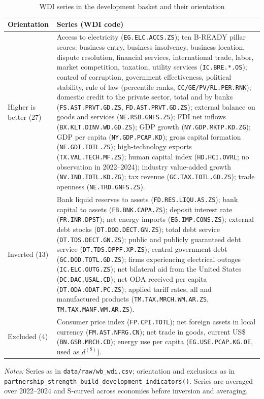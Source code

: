 \begin{table}[tbp]
\centering
\begin{threeparttable}
\caption{WDI series in the development basket and their orientation}
\label{tab:wdi_basket}
\scriptsize
\begin{tabularx}{\textwidth}{@{}p{2.1cm} >{\raggedright\arraybackslash}X@{}}
\toprule
Orientation & Series (WDI code)\\
\midrule
Higher is better (27) &
Access to electricity (\texttt{EG.ELC.ACCS.ZS}); ten B-READY pillar scores: business entry,
business insolvency, business location, dispute resolution, financial services, international
trade, labor, market competition, taxation, utility services (\texttt{IC.BRE.*.OS}); control of
corruption, government effectiveness, political stability, rule of law (percentile ranks,
\texttt{CC/GE/PV/RL.PER.RNK}); domestic credit to the private sector, total and by banks
(\texttt{FS.AST.PRVT.GD.ZS}, \texttt{FD.AST.PRVT.GD.ZS}); external balance on goods and services
(\texttt{NE.RSB.GNFS.ZS}); FDI net inflows (\texttt{BX.KLT.DINV.WD.GD.ZS}); GDP growth
(\texttt{NY.GDP.MKTP.KD.ZG}); GDP per capita (\texttt{NY.GDP.PCAP.KD}); gross capital formation
(\texttt{NE.GDI.TOTL.ZS}); high-technology exports (\texttt{TX.VAL.TECH.MF.ZS}); human capital index
(\texttt{HD.HCI.OVRL}; no observation in 2022--2024); industry value-added growth
(\texttt{NV.IND.TOTL.KD.ZG}); tax revenue (\texttt{GC.TAX.TOTL.GD.ZS}); trade openness
(\texttt{NE.TRD.GNFS.ZS}).\\[2pt]
Inverted (13) &
Bank liquid reserves to assets (\texttt{FD.RES.LIQU.AS.ZS}); bank capital to assets
(\texttt{FB.BNK.CAPA.ZS}); deposit interest rate (\texttt{FR.INR.DPST}); net energy imports
(\texttt{EG.IMP.CONS.ZS}); external debt stocks (\texttt{DT.DOD.DECT.GN.ZS}); total debt service
(\texttt{DT.TDS.DECT.GN.ZS}); public and publicly guaranteed debt service (\texttt{DT.TDS.DPPF.XP.ZS});
central government debt (\texttt{GC.DOD.TOTL.GD.ZS}); firms experiencing electrical outages
(\texttt{IC.ELC.OUTG.ZS}); net bilateral aid from the United States (\texttt{DC.DAC.USAL.CD}); net
ODA received per capita (\texttt{DT.ODA.ODAT.PC.ZS}); applied tariff rates, all and manufactured
products (\texttt{TM.TAX.MRCH.WM.AR.ZS}, \texttt{TM.TAX.MANF.WM.AR.ZS}).\\[2pt]
Excluded (4) &
Consumer price index (\texttt{FP.CPI.TOTL}); net foreign assets in local currency
(\texttt{FM.AST.NFRG.CN}); net trade in goods, current US\$ (\texttt{BN.GSR.MRCH.CD}); energy use per
capita (\texttt{EG.USE.PCAP.KG.OE}, used as $d^{(8)}$).\\
\bottomrule
\end{tabularx}
\begin{tablenotes}[flushleft]\footnotesize
\item \textit{Notes:} Series as in \texttt{data/raw/wb\_wdi.csv}; orientation and exclusions as in
\texttt{partnership\_strength\_build\_development\_indicators()}. Series are averaged over
2022--2024 and S-curved across economies before inversion and averaging.
\end{tablenotes}
\end{threeparttable}
\end{table}

